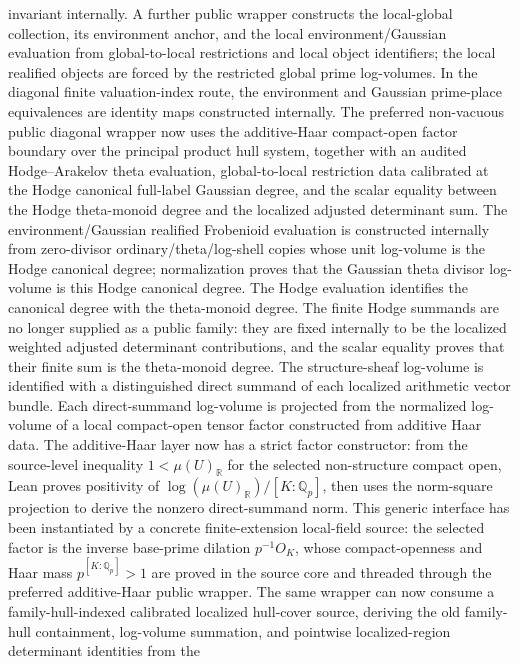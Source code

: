\documentclass[11pt]{article}
\theoremstyle{plain}
\theoremstyle{definition}
\theoremstyle{remark}
\begin{document}
invariant internally.  A further public wrapper constructs the local-global
collection, its environment anchor, and the local environment/Gaussian
evaluation from global-to-local restrictions and local object identifiers; the
local realified objects are forced by the restricted global prime log-volumes.
In the diagonal finite valuation-index route, the environment and Gaussian
prime-place equivalences are identity maps constructed internally.  The
preferred non-vacuous public diagonal wrapper now uses the additive-Haar
compact-open factor boundary over the principal product hull system, together
with an audited Hodge--Arakelov theta evaluation, global-to-local restriction
data calibrated at the Hodge canonical full-label Gaussian degree, and the
scalar equality between the Hodge theta-monoid degree and the localized
adjusted determinant sum.  The environment/Gaussian
realified Frobenioid evaluation is
constructed internally from zero-divisor ordinary/theta/log-shell copies whose
unit log-volume is the Hodge canonical degree; normalization proves that the
Gaussian theta divisor log-volume is this Hodge canonical degree.  The Hodge
evaluation identifies the canonical degree with the theta-monoid degree.  The
finite Hodge summands are no longer supplied as a public family: they are fixed
internally to be the localized weighted adjusted determinant contributions,
and the scalar equality proves that their finite sum is the theta-monoid
degree.  The
structure-sheaf log-volume is identified with a distinguished direct summand
of each localized arithmetic vector bundle.  Each direct-summand log-volume is
projected from the normalized log-volume of a local compact-open tensor factor
constructed from additive Haar data.  The additive-Haar layer now has a strict
factor constructor: from the source-level inequality \(1<\mu(U)_{\mathbb R}\)
for the selected non-structure compact open, Lean proves positivity of
\(\log(\mu(U)_{\mathbb R})/[K:\mathbb Q_p]\), then uses the norm-square
projection to derive the nonzero direct-summand norm.  This generic interface
has been instantiated by a concrete finite-extension local-field source:
the selected factor is the inverse base-prime dilation \(p^{-1}O_K\), whose
compact-openness and Haar mass \(p^{[K:\mathbb Q_p]}>1\) are proved in the
source core and threaded through the preferred additive-Haar public wrapper.
The same wrapper can now consume a family-hull-indexed calibrated localized
hull-cover source, deriving the old family-hull containment, log-volume
summation, and pointwise localized-region determinant identities from the
\end{document}
